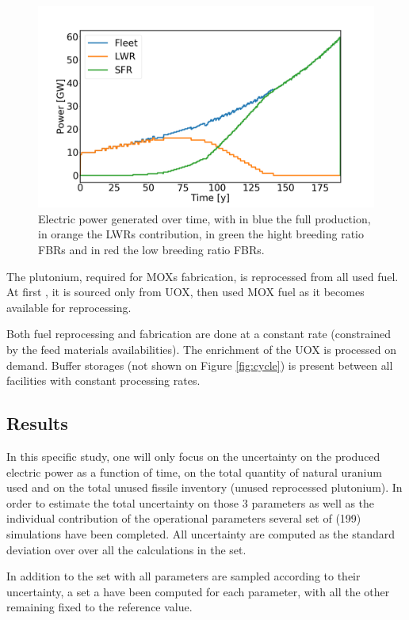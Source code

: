 \documentclass{anstrans}
\begin{document}
\begin{figure}[ht] %
    \centering
    \includegraphics[scale=0.18]{power.png}
    \caption{Electric power generated over time, with in blue the full production,
        in orange the \glspl{LWR} contribution, in green the hight breeding ratio
        \glspl{FBR} and in red the low breeding ratio \glspl{FBR}.}\label{fig:power}
\end{figure}


The plutonium, required for \glspl{MOX} fabrication, is reprocessed from all
used fuel. At first , it is sourced only from UOX, then used MOX fuel as it becomes
available for reprocessing.

Both fuel reprocessing and fabrication are done at a constant rate (constrained
by the feed materials availabilities). The enrichment of the UOX is processed on
demand. Buffer storages (not shown on Figure \ref{fig:cycle}) is present between
all facilities with constant processing rates.


\subsection{Results}
In this specific study, one will only focus on the uncertainty on the produced
electric power as a function of time, on the total quantity of natural uranium
used and on the total unused fissile inventory (unused reprocessed plutonium).
In order to estimate the total uncertainty on those 3 parameters as well as the
individual contribution of the operational parameters several set of (199)
simulations have been completed.  All uncertainty are computed as the standard
deviation over over all the calculations in the set.

In addition to the set with all parameters are sampled according to their
uncertainty, a set a have been computed for each parameter, with all the other
remaining fixed to the reference value.
\end{document}
